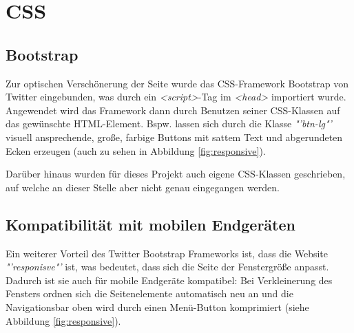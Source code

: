 \section{CSS}
\label{CSS}
\subsection{Bootstrap}
\label{Bootstrap}
Zur optischen Verschönerung der Seite wurde das CSS-Framework Bootstrap von Twitter eingebunden, was durch ein \textit{<script>}-Tag im \textit{<head>} importiert wurde. Angewendet wird das Framework dann durch Benutzen seiner CSS-Klassen auf das gewünschte HTML-Element. Bspw. lassen sich durch die Klasse \textit{"'btn-lg"'} visuell ansprechende, große, farbige Buttons mit sattem Text und abgerundeten Ecken erzeugen (auch zu sehen in Abbildung \vref{fig:responsive}).
\par
Darüber hinaus wurden für dieses Projekt auch eigene CSS-Klassen geschrieben, auf welche an dieser Stelle aber nicht genau eingegangen werden.

\subsection{Kompatibilität mit mobilen Endgeräten}
\label{Kompatibilität mit mobilen Endgeräten}
Ein weiterer Vorteil des Twitter Bootstrap Frameworks ist, dass die Website \textit{"'responisve"'} ist, was bedeutet, dass sich die Seite der Fenstergröße anpasst. Dadurch ist sie auch für mobile Endgeräte kompatibel: Bei Verkleinerung des Fensters ordnen sich die Seitenelemente automatisch neu an und die Navigationsbar oben wird durch einen Menü-Button komprimiert (siehe Abbildung \vref{fig:responsive}).

